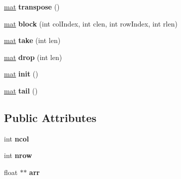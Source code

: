 \begin{DoxyCompactItemize}
\mbox{\label{class_matrix_vector_1_1mat_abe8ff1f6f29fe9e406b755c3f655dd18}} 
\mbox{\hyperlink{class_matrix_vector_1_1mat}{mat}} {\bfseries transpose} ()
\item 
\mbox{\label{class_matrix_vector_1_1mat_aa623e369c2af8582646a44d0c7614db0}} 
\mbox{\hyperlink{class_matrix_vector_1_1mat}{mat}} {\bfseries block} (int col\+Index, int clen, int row\+Index, int rlen)
\item 
\mbox{\label{class_matrix_vector_1_1mat_a24f0cefca0d6f79545c2f130fda0b82c}} 
\mbox{\hyperlink{class_matrix_vector_1_1mat}{mat}} {\bfseries take} (int len)
\item 
\mbox{\label{class_matrix_vector_1_1mat_a7cd7e57bf6907ee80445afdb462fd095}} 
\mbox{\hyperlink{class_matrix_vector_1_1mat}{mat}} {\bfseries drop} (int len)
\item 
\mbox{\label{class_matrix_vector_1_1mat_a96ad31de366c370206569f0be9e1de5e}} 
\mbox{\hyperlink{class_matrix_vector_1_1mat}{mat}} {\bfseries init} ()
\item 
\mbox{\label{class_matrix_vector_1_1mat_a81893c6dae060972bce5ff67c7a07ee9}} 
\mbox{\hyperlink{class_matrix_vector_1_1mat}{mat}} {\bfseries tail} ()
\end{DoxyCompactItemize}
\subsection*{Public Attributes}
\begin{DoxyCompactItemize}
\item 
\mbox{\label{class_matrix_vector_1_1mat_a592d970921c2d031bf648d70e5f448dc}} 
int {\bfseries ncol}
\item 
\mbox{\label{class_matrix_vector_1_1mat_af448f5d4ef6da3b9c6d72870f690695d}} 
int {\bfseries nrow}
\item 
\mbox{\label{class_matrix_vector_1_1mat_a5f1dd191eaa81d863fd0c2a546cf7e67}} 
float $\ast$$\ast$ {\bfseries arr}
\end{DoxyCompactItemize}


